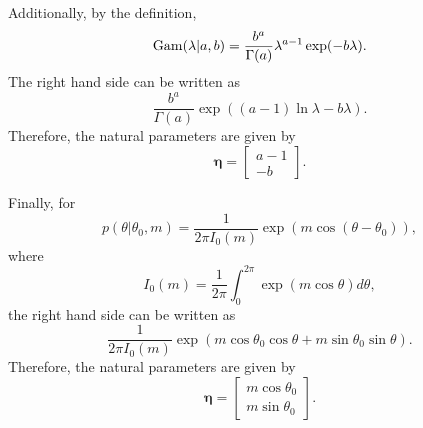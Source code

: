 Additionally, by the definition,
%
\begin{equation}
{\rm Gam} (\lambda | a, b)
=
\frac{b ^ a}{\Gamma(a)}
\lambda ^ {a - 1}
\exp (- b \lambda).
\end{equation}
%
The right hand side can be written as
%
\begin{equation}
\frac{b ^ a}{\Gamma(a)}
\exp 
\left( 
	(a - 1)
	\ln \lambda
	- 
	b \lambda
\right).
\end{equation}
%
Therefore, the natural parameters are given by
\[
\bm{\eta}
=
\begin{bmatrix}
a - 1  
\\
- b 
\end{bmatrix}
.
\]

Finally, for 
%
\begin{equation}
p(\theta | \theta_0, m)
=
\frac{1}{2 \pi I_0 (m)}
\exp
\left(
	m 
	\cos (\theta - \theta_0)
\right),
\end{equation}
%
where
%
\begin{equation}
I_0(m)
=
\frac{1}{2 \pi}
\int_{0}^{2 \pi}
\exp(m \cos \theta) 
d\theta,
\end{equation}
%
the right hand side can be written as
%
\begin{equation}
\frac{1}{2 \pi I_0 (m)}
\exp
(
m 
\cos \theta_0 
\cos \theta 
+ 
m 
\sin \theta_0 
\sin \theta
).
\end{equation}
%
Therefore, the natural parameters are given by
\[
\bm{\eta}
=
\begin{bmatrix}
m \cos \theta_0  
\\
m \sin \theta_0
\end{bmatrix}
.
\]


